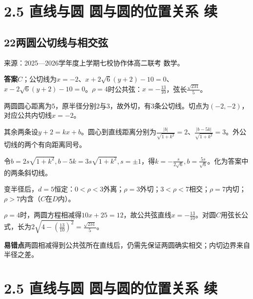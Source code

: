 \documentclass[UTF8,11pt,a4paper,fontset=windows]{ctexart}
\newcommand{\qhead}[2]{\subsection{#1\texorpdfstring{\quad}{ }#2}}
\newcommand{\qsource}[1]{{\footnotesize 来源：#1。\par}}
\begin{document}
\section{2.5 直线与圆 圆与圆的位置关系 续}

\qhead{22}{两圆公切线与相交弦}
\qsource{2025—2026学年度上学期七校协作体高二联考 数学}
\textbf{答案}\quad \(C\)；公切线为\(x= - 2\)、\(x+ 2\sqrt{6}\left(y+ 2\right)- 10= 0\)、\(x- 2\sqrt{6}\left(y+ 2\right)- 10= 0\)。\(\rho = 4\)时公共弦：\(x= - \frac{13}{10}\)，弦长\(\frac{\sqrt{231}}{5}\)。\par
两圆圆心距离为\(5\)，原半径分别\(2\)与\(3\)，故外切，有\(3\)条公切线。切点为\(\left(- 2,\allowbreak - 2\right)\)，对应公共内切线\(x= - 2\)。\par
其余两条设\(y+ 2= kx+ b\)。圆心到直线距离分别为\(\frac{\lvert b\rvert }{\sqrt{1+ k^{2}}}= 2\)、\(\frac{\lvert b- 5k\rvert }{\sqrt{1+ k^{2}}}= 3\)。外公切线的两个有向距离同号。\par
令\(b= 2s\sqrt{1+ k^{2}},\allowbreak b- 5k= 3s\sqrt{1+ k^{2}},\allowbreak s= \pm 1\)，得\(k= - \frac{s}{2\sqrt{6}},\allowbreak b= \frac{5s}{\sqrt{6}}\)。化为答案中的两条斜切线。\par
变半径后，\(d= 5\)恒定：\(0< \rho < 3\)外离；\(\rho = 3\)外切；\(3< \rho < 7\)相交；\(\rho = 7\)内切；\(\rho > 7\)内含（\(C\)在\(D\)内）。\par
\(\rho = 4\)时，两圆方程相减得\(10x+ 25= 12\)，故公共弦直线\(x= - \frac{13}{10}\)。对圆\(C\)用弦长公式，长为\(2\sqrt{4- \left(\frac{13}{10}\right)^{2}}= \frac{\sqrt{231}}{5}\)。\par
{\small\textbf{易错点}\quad 两圆相减得到公共弦所在直线后，仍需先保证两圆确实相交；内切边界来自半径之差。\par}

\clearpage

\section{2.5 直线与圆 圆与圆的位置关系 续}
\end{document}
